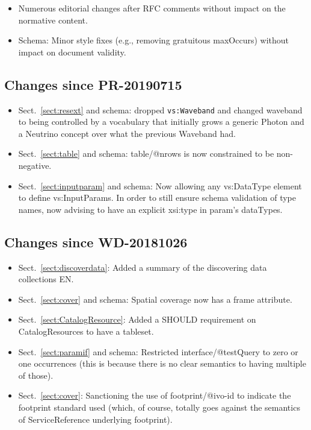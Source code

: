 \documentclass[11pt,a4paper]{ivoa}
\begin{document}
\begin{itemize}
\item Numerous editorial changes after RFC comments without
impact on the normative content.
\item Schema: Minor style fixes (e.g., removing gratuitous maxOccurs)
without impact on document validity.
\end{itemize}

\subsection{Changes since PR-20190715}

\begin{itemize}
\item Sect.~\ref{sect:resext} and schema: 
dropped \verb|vs:Waveband| and changed waveband to being
controlled by a vocabulary that initially grows a generic Photon and a
Neutrino concept over what the previous Waveband had.
\item Sect.~\ref{sect:table} and schema: table/@nrows is now constrained to be non-negative.
\item Sect.~\ref{sect:inputparam} and schema:
Now allowing any vs:DataType element to define vs:InputParams.
In order to still ensure schema validation of type names,
now advising to have an explicit xsi:type in param's dataTypes.
\end{itemize}

\subsection{Changes since  WD-20181026}

\begin{itemize}
\item Sect.~\ref{sect:discoverdata}: 
Added a summary of the discovering data collections EN.
\item Sect.~\ref{sect:cover} and schema: 
Spatial coverage now has a frame attribute.
\item Sect.~\ref{sect:CatalogResource}: 
Added a SHOULD requirement on CatalogResources to 
have a tableset.
\item Sect.~\ref{sect:paramif} and schema: 
Restricted interface/@testQuery to zero or one occurrences (this
is because there is no clear semantics to having multiple of those).
\item Sect.~\ref{sect:cover}:
Sanctioning the use of footprint/@ivo-id to indicate the footprint 
standard used (which, of course, totally goes against the semantics of
ServiceReference underlying footprint).
\end{itemize}
\end{document}
